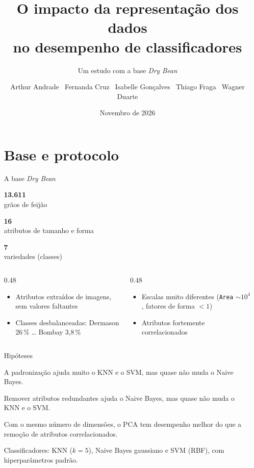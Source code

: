\documentclass[aspectratio=169,11pt]{beamer}
\title[Representação dos dados e classificadores]{O impacto da representação dos dados\\
no desempenho de classificadores}
\subtitle{Um estudo com a base \emph{Dry Bean}}
\author[Grupo]{Arthur Andrade \textbullet\ Fernanda Cruz \textbullet\ Isabelle Gonçalves \textbullet\ Thiago Fraga \textbullet\ Wagner Duarte}
\institute[UFMG]{Introdução ao Reconhecimento de Padrões \textbullet\ UFMG}
\date{Novembro de 2026}
\newcommand{\pendente}[1]{\textcolor{alerta}{[#1]}}
\newcommand{\numero}[2]{%
  \begin{minipage}[t]{0.3\textwidth}\centering
    {\color{destaque}\fontsize{26}{28}\selectfont\bfseries #1}\\[0.3em]
    {\small #2}
  \end{minipage}}
\begin{document}
\begin{frame}[plain]
  \titlepage
\end{frame}

\section{Base e protocolo}

\begin{frame}{A base \emph{Dry Bean}}
  \vspace{0.5em}
  \centering
  \numero{13.611}{grãos de feijão}\hfill
  \numero{16}{atributos de tamanho e forma}\hfill
  \numero{7}{variedades (classes)}

  \vspace{1.2em}
  \raggedright
  \begin{columns}[T]
    \begin{column}{0.48\textwidth}
      \begin{itemize}
        \item Atributos extraídos de imagens, sem valores faltantes
        \item Classes desbalanceadas: Dermason 26\,\% \dots{} Bombay 3,8\,\%
      \end{itemize}
    \end{column}
    \begin{column}{0.48\textwidth}
      \begin{itemize}
        \item Escalas muito diferentes (\texttt{Area} $\sim 10^4$, fatores de forma $<1$)
        \item Atributos fortemente correlacionados
      \end{itemize}
    \end{column}
  \end{columns}
  \vfill
\end{frame}

\begin{frame}{Hipóteses}
  \begin{description}[H1]
    \item[H1] A padronização ajuda muito o KNN e o SVM, mas quase não muda o Naive Bayes.
    \item[H2] Remover atributos redundantes ajuda o Naive Bayes, mas quase não muda o KNN e o SVM.
    \item[H3] Com o mesmo número de dimensões, o PCA tem desempenho melhor do que a
      remoção de atributos correlacionados.
  \end{description}
  \vfill
  Classificadores: KNN ($k=5$), Naive Bayes gaussiano e SVM (RBF), com hiperparâmetros padrão.
\end{frame}
\end{document}
